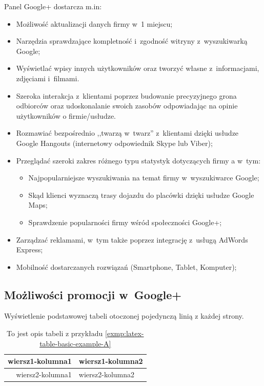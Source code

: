 Panel Google+ dostarcza m.in:

\begin{itemize}
\item Możliwość aktualizacji danych firmy w~1 miejscu;

\item Narzędzia sprawdzające kompletność i~zgodność witryny z~wyszukiwarką \mbox{Google};

\item Wyświetlać wpisy innych użytkowników oraz tworzyć własne z~informacjami, zdjęciami i~filmami.

\item Szeroka interakcja z~klientami poprzez budowanie precyzyjnego grona odbiorców oraz udoskonalanie swoich zasobów odpowiadając na opinie użytkowników o firmie/usłudze.

\item Rozmawiać bezpośrednio ,,twarzą w~twarz'' z~klientami dzięki usłudze Google Hangouts (internetowy odpowiednik Skype lub Viber);

\item Przeglądać szeroki zakres różnego typu statystyk dotyczących firmy a w~tym:
    \begin{itemize}
    \item Najpopularniejsze wyszukiwania na temat firmy w~wyszukiwarce Google;
    \item Skąd klienci wyznaczą trasy dojazdu do placówki dzięki usłudze Google Maps;
    \item Sprawdzenie popularności firmy wśród społeczności Google+;
    \end{itemize}

\item Zarządzać reklamami, w~tym także poprzez integrację z~usługą AdWords Express;

\item Mobilność dostarczanych rozwiązań (Smartphone, Tablet, Komputer);
\end{itemize}

\subsection{Możliwości promocji w~Google+}
\lipsum[80-83]

\begin{exmp}
\label{exmp:latex-table-basic-example-A}
Wyświetlenie podstawowej tabeli otoczonej pojedynczą linią  z każdej strony. \\
\begin{table}[!h]
\centering
    \begin{tabular}{|r|l|}
    \hline
    wiersz1-kolumna1 & wiersz1-kolumna2 \\ 
    \hline
    wiersz2-kolumna1 & wiersz2-kolumna2 \\ 
    \hline
    \end{tabular}
\caption{To jest opis tabeli z przykładu \ref{exmp:latex-table-basic-example-A}}
\label{tab:tab:prosta-tabela-przyklad-A}
\end{table}
\end{exmp}

